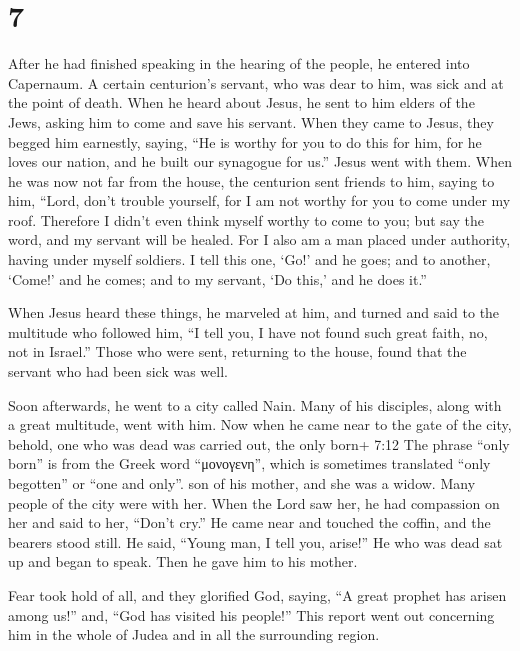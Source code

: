 \hypertarget{section-6}{%
\section{7}\label{section-6}}

 After he had finished speaking in the hearing of the
people, he entered into Capernaum.  A certain centurion's
servant, who was dear to him, was sick and at the point of death.
 When he heard about Jesus, he sent to him elders of the
Jews, asking him to come and save his servant.  When they
came to Jesus, they begged him earnestly, saying, ``He is worthy for you
to do this for him,  for he loves our nation, and he built
our synagogue for us.''  Jesus went with them. When he was
now not far from the house, the centurion sent friends to him, saying to
him, ``Lord, don't trouble yourself, for I am not worthy for you to come
under my roof.  Therefore I didn't even think myself worthy
to come to you; but say the word, and my servant will be healed.
 For I also am a man placed under authority, having under
myself soldiers. I tell this one, `Go!' and he goes; and to another,
`Come!' and he comes; and to my servant, `Do this,' and he does it.''

 When Jesus heard these things, he marveled at him, and
turned and said to the multitude who followed him, ``I tell you, I have
not found such great faith, no, not in Israel.''  Those who
were sent, returning to the house, found that the servant who had been
sick was well.

 Soon afterwards, he went to a city called Nain. Many of
his disciples, along with a great multitude, went with him.
 Now when he came near to the gate of the city, behold, one
who was dead was carried out, the only born+ 7:12 The phrase ``only
born'' is from the Greek word ``μονογενη'', which is sometimes
translated ``only begotten'' or ``one and only''. son of his mother, and
she was a widow. Many people of the city were with her. 
When the Lord saw her, he had compassion on her and said to her, ``Don't
cry.''  He came near and touched the coffin, and the
bearers stood still. He said, ``Young man, I tell you, arise!''
 He who was dead sat up and began to speak. Then he gave
him to his mother.

 Fear took hold of all, and they glorified God, saying, ``A
great prophet has arisen among us!'' and, ``God has visited his
people!''  This report went out concerning him in the whole
of Judea and in all the surrounding region.


